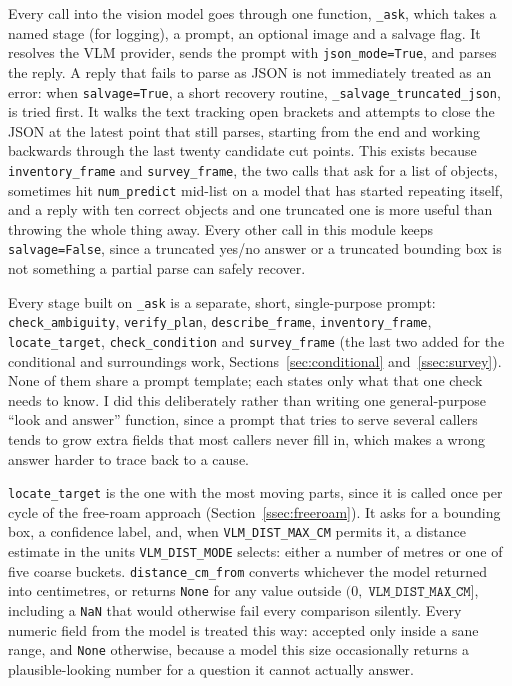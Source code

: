 \label{sec:vlm}

Every call into the vision model goes through one function, \texttt{\_ask}, which
takes a named stage (for logging), a prompt, an optional image and a salvage
flag. It resolves the VLM provider, sends the prompt with \texttt{json\_mode=True},
and parses the reply. A reply that fails to parse as JSON is not immediately
treated as an error: when \texttt{salvage=True}, a short recovery routine,
\texttt{\_salvage\_truncated\_json}, is tried first. It walks the text tracking
open brackets and attempts to close the JSON at the latest point that still
parses, starting from the end and working backwards through the last twenty
candidate cut points. This exists because \texttt{inventory\_frame} and
\texttt{survey\_frame}, the two calls that ask for a list of objects, sometimes
hit \texttt{num\_predict} mid-list on a model that has started repeating itself,
and a reply with ten correct objects and one truncated one is more useful than
throwing the whole thing away. Every other call in this module keeps
\texttt{salvage=False}, since a truncated yes/no answer or a truncated bounding
box is not something a partial parse can safely recover.

Every stage built on \texttt{\_ask} is a separate, short, single-purpose prompt:
\texttt{check\_ambiguity}, \texttt{verify\_plan}, \texttt{describe\_frame},
\texttt{inventory\_frame}, \texttt{locate\_target}, \texttt{check\_condition} and
\texttt{survey\_frame} (the last two added for the conditional and surroundings
work, Sections~\ref{sec:conditional} and~\ref{ssec:survey}). None of them share a
prompt template; each states only what that one check needs to know. I did this
deliberately rather than writing one general-purpose ``look and answer'' function,
since a prompt that tries to serve several callers tends to grow extra fields
that most callers never fill in, which makes a wrong answer harder to trace back
to a cause.

\texttt{locate\_target} is the one with the most moving parts, since it is called
once per cycle of the free-roam approach (Section~\ref{ssec:freeroam}). It asks
for a bounding box, a confidence label, and, when \texttt{VLM\_DIST\_MAX\_CM}
permits it, a distance estimate in the units \texttt{VLM\_DIST\_MODE} selects:
either a number of metres or one of five coarse buckets. \texttt{distance\_cm\_from}
converts whichever the model returned into centimetres, or returns \texttt{None}
for any value outside \((0,\;\texttt{VLM\_DIST\_MAX\_CM}]\), including a
\texttt{NaN} that would otherwise fail every comparison silently. Every numeric
field from the model is treated this way: accepted only inside a sane range, and
\texttt{None} otherwise, because a model this size occasionally returns a
plausible-looking number for a question it cannot actually answer.

